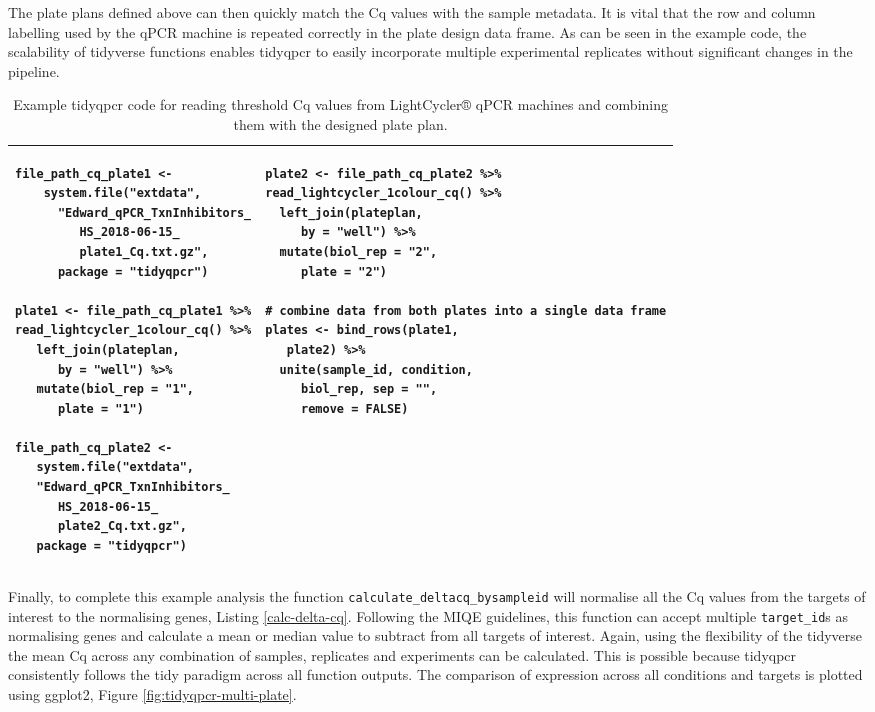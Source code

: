 \documentclass[../main.tex]{subfiles}
\begin{document}
The plate plans defined above can then quickly match the Cq values with the sample metadata. It is vital that the row and column labelling used by the qPCR machine is repeated correctly in the plate design data frame. 
As can be seen in the example code, the scalability of tidyverse functions enables tidyqpcr to easily incorporate multiple experimental replicates without significant changes in the pipeline.
\begin{table}
\centering
\begin{tabular}{|p{5.6cm}  p{5.6cm}|}
\hline
 \begin{lstlisting}[firstnumber=40, style=mystyle]
 file_path_cq_plate1 <- 
    system.file("extdata",
      "Edward_qPCR_TxnInhibitors_
         HS_2018-06-15_
         plate1_Cq.txt.gz",
      package = "tidyqpcr")

plate1 <- file_path_cq_plate1 %>%
read_lightcycler_1colour_cq() %>%
   left_join(plateplan,
      by = "well") %>%
   mutate(biol_rep = "1",
      plate = "1")

file_path_cq_plate2 <-
   system.file("extdata",
   "Edward_qPCR_TxnInhibitors_
      HS_2018-06-15_
      plate2_Cq.txt.gz",
   package = "tidyqpcr")
\end{lstlisting} &
\begin{lstlisting}[firstnumber=60, style=mystyle]
plate2 <- file_path_cq_plate2 %>%
read_lightcycler_1colour_cq() %>%
  left_join(plateplan,
     by = "well") %>%
  mutate(biol_rep = "2",
     plate = "2")

# combine data from both plates into a single data frame
plates <- bind_rows(plate1,
   plate2) %>%
  unite(sample_id, condition,
     biol_rep, sep = "",
     remove = FALSE)
\end{lstlisting} \\
\hline
\end{tabular}
\caption{Example tidyqpcr code for reading threshold Cq values from LightCycler® qPCR machines and combining them with the designed plate plan.}
\label{read-raw-data}
\end{table}

Finally, to complete this example analysis the function \lstinline{calculate_deltacq_}\lstinline{bysampleid} will normalise all the Cq values from the targets of interest to the normalising genes, Listing \ref{calc-delta-cq}. 
Following the MIQE guidelines,  this function can accept multiple \lstinline{target_id}s as normalising genes and calculate a mean or median value to subtract from all targets of interest. 
Again, using the flexibility of the tidyverse the mean Cq across any combination of samples, replicates and experiments can be calculated. 
This is possible because tidyqpcr consistently follows the tidy paradigm across all function outputs. 
The comparison of expression across all conditions and targets is plotted using ggplot2, Figure \ref{fig:tidyqpcr-multi-plate}.
\end{document}
